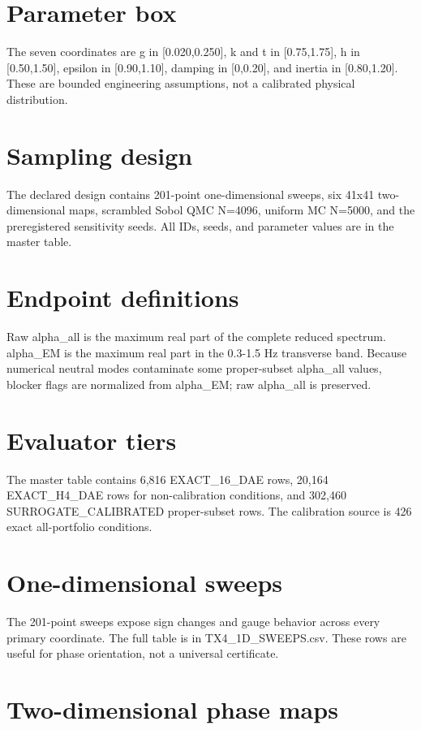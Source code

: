 \documentclass[11pt]{article}
\begin{document}
\section{Parameter box}

The seven coordinates are g in [0.020,0.250], k and t in [0.75,1.75], h in [0.50,1.50], epsilon in [0.90,1.10], damping in [0,0.20], and inertia in [0.80,1.20]. These are bounded engineering assumptions, not a calibrated physical distribution.

\section{Sampling design}

The declared design contains 201-point one-dimensional sweeps, six 41x41 two-dimensional maps, scrambled Sobol QMC N=4096, uniform MC N=5000, and the preregistered sensitivity seeds. All IDs, seeds, and parameter values are in the master table.

\section{Endpoint definitions}

Raw alpha_all is the maximum real part of the complete reduced spectrum. alpha_EM is the maximum real part in the 0.3-1.5 Hz transverse band. Because numerical neutral modes contaminate some proper-subset alpha_all values, blocker flags are normalized from alpha_EM; raw alpha_all is preserved.

\section{Evaluator tiers}

The master table contains 6,816 EXACT_16_DAE rows, 20,164 EXACT_H4_DAE rows for non-calibration conditions, and 302,460 SURROGATE_CALIBRATED proper-subset rows. The calibration source is 426 exact all-portfolio conditions.

\section{One-dimensional sweeps}

The 201-point sweeps expose sign changes and gauge behavior across every primary coordinate. The full table is in TX4_1D_SWEEPS.csv. These rows are useful for phase orientation, not a universal certificate.

\section{Two-dimensional phase maps}
\end{document}
